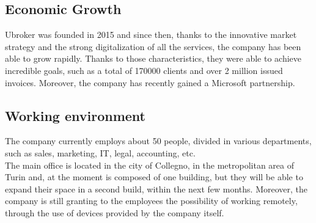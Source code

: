 \documentclass[12pt, a4paper, oneside]{article}
\begin{document}
\newpage
\subsection{Economic Growth}
Ubroker was founded in 2015 and since then, thanks to the innovative market strategy and the strong digitalization of all the services, the company has been able to grow rapidly. Thanks to those characteristics,
they were able to achieve incredible goals, such as a total of 170000 clients and over 2 million issued invoices. Moreover, the company has recently gained a Microsoft partnership.

\subsection{Working environment}
The company currently employs about 50 people, divided in various departments, such as sales, marketing, IT, legal, accounting, etc.\\
The main office is located in the city of Collegno, in the metropolitan area of Turin and, at the moment is composed of one building, but they will be able to expand their space in a second build, within the next
few months. Moreover, the company is still granting to the employees the possibility of working remotely, through the use of devices provided by the company itself.
\end{document}
